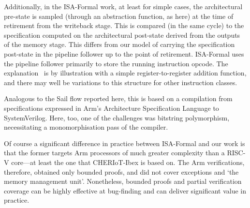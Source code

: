 Additionally, in the ISA-Formal work, at least for simple cases, the
architectural pre-state is sampled (through an abstraction function, as here)
at the time of retirement from the writeback stage. This is compared (in the same
cycle) to the specification computed on the architectural post-state derived
from the outputs of the memory stage. This differs from our model of carrying
the specification post-state in the pipeline follower up to the point of retirement.
ISA-Formal uses the pipeline follower primarily to store the running instruction
opcode. The explanation~\cite{Reid-2016-EEV} is
by illustration with a simple register-to-register addition function, and there
may well be variations to this structure for other instruction classes.

Analogous to the Sail flow reported here, this is based on a compilation
from specifications expressed in Arm's Architecture Specification Language
to SystemVerilog. Here, too, one of the challenges was bitstring
polymorphism, necessitating a monomorphisation pass of the compiler.

Of course a significant difference in practice between ISA-Formal and our
work is that the former targets Arm processors of much greater complexity
than a RISC-V core---at least the one that CHERIoT-Ibex is based on. The
Arm verifications, therefore, obtained only bounded proofs, and
did not cover exceptions and `the memory management unit'.  Nonetheless,
bounded proofs and partial verification coverage can be highly effective at
bug-finding and can deliver significant value in practice.